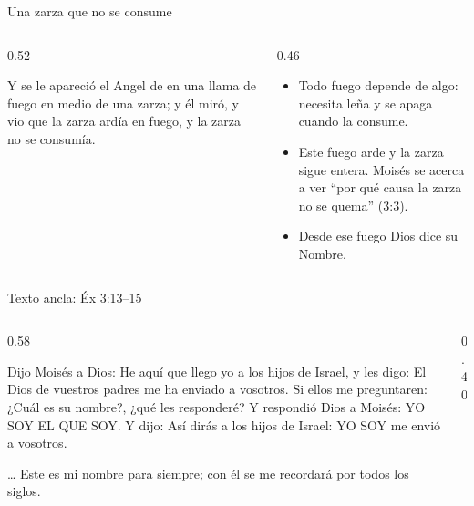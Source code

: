 \begin{frame}{Una zarza que no se consume}
\begin{columns}[t,onlytextwidth]
\begin{column}{0.52\textwidth}
\begin{center}\end{center}
\begin{cita}Y se le apareció el Angel de \SENOR{} en una llama de fuego en medio de una zarza; y él miró, y vio que la zarza ardía en fuego, y la zarza no se consumía.\end{cita}
\end{column}
\begin{column}{0.46\textwidth}\small
\begin{itemize}
\item Todo fuego depende de algo: necesita leña y se apaga cuando la consume.
\item Este fuego arde y la zarza sigue entera. Moisés se acerca a ver ``por qué causa la zarza no se quema'' (3:3).
\item Desde ese fuego Dios dice su Nombre.
\end{itemize}
\end{column}
\end{columns}
\end{frame}

\begin{frame}{Texto ancla: Éx 3:13--15}
\begin{columns}[c,onlytextwidth]
\begin{column}{0.58\textwidth}
\begin{cita}Dijo Moisés a Dios: He aquí que llego yo a los hijos de Israel, y les digo: El Dios de vuestros padres me ha enviado a vosotros. Si ellos me preguntaren: ¿Cuál es su nombre?, ¿qué les responderé? Y respondió Dios a Moisés: YO SOY EL QUE SOY. Y dijo: Así dirás a los hijos de Israel: YO SOY me envió a vosotros.\end{cita}
\begin{cita}\ldots{} Este es mi nombre para siempre; con él se me recordará por todos los siglos.\end{cita}
\end{column}
\begin{column}{0.40\textwidth}\end{column}
\end{columns}
\end{frame}

